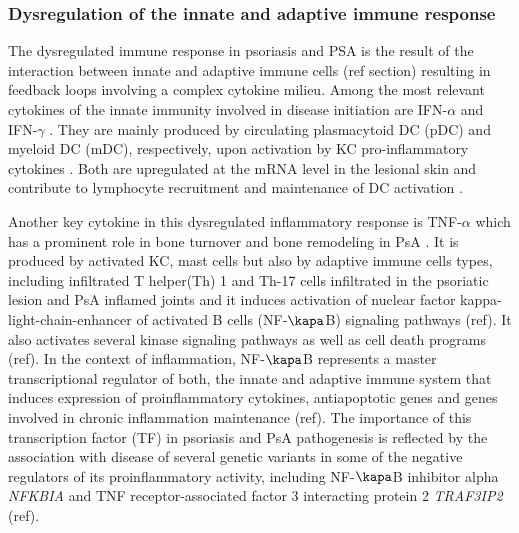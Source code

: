\subsubsection*{Dysregulation of the innate and adaptive immune response}
The dysregulated  immune response in psoriasis and PSA is the result of the interaction between innate and adaptive immune cells (ref section) resulting in feedback loops involving a complex cytokine milieu. Among the most relevant cytokines of the innate immunity involved in disease initiation are IFN-$\alpha$ and IFN-$\gamma$ \parencite{Leanne2009}. They are mainly produced by circulating plasmacytoid DC (pDC) and myeloid DC (mDC), respectively, upon activation by KC pro-inflammatory cytokines \parencite{Perera2012}. Both are upregulated at the mRNA level in the lesional skin and contribute to lymphocyte recruitment and maintenance of DC activation \parencite{Schmid1994}. 

Another key cytokine in this dysregulated inflammatory response is TNF-$\alpha$ which has a prominent role in bone turnover and bone remodeling in PsA \parencite{Mensah2008}. It is produced by activated KC, mast cells but also by adaptive immune cells types, including infiltrated T helper(Th) 1 and Th-17 cells infiltrated in the psoriatic lesion and PsA inflamed joints \parencite{Perera2012} and it induces activation of nuclear factor kappa-light-chain-enhancer of activated B cells (NF-$\kapa$B) signaling pathways (ref). It also activates several kinase signaling pathways as well as cell death programs (ref). In the context of inflammation, NF-$\kapa$B represents a master transcriptional regulator of both, the innate and adaptive immune system that induces expression of proinflammatory cytokines, antiapoptotic genes and genes involved in chronic inflammation maintenance (ref). The importance of this transcription factor (TF) in psoriasis and PsA pathogenesis is reflected by the association with disease of several genetic variants in some of the negative regulators of its proinflammatory activity, including NF-$\kapa$B inhibitor alpha \textit{NFKBIA} and TNF receptor-associated factor 3 interacting protein 2 \textit{TRAF3IP2} (ref).
 
